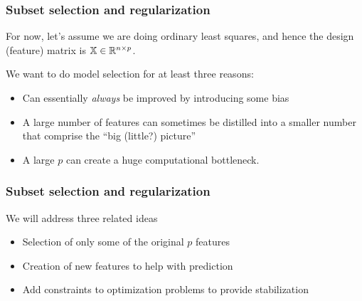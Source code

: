 \documentclass{beamer}
\begin{document}
\title{}
\subtitle{\classTitle}
\date{}



\begin{frame}
\maketitle
%
\organization
%
\end{frame}

\begin{frame}
\frametitle{Subset selection and regularization}
For now, let's assume we are doing ordinary least squares, and hence the design (feature) matrix is $\mathbb{X} \in \mathbb{R}^{n \times p}$.

\vsp
We want to do model selection for at least three reasons:
\begin{itemize}
\item {} Can essentially {\it always} be improved by introducing some bias 
\item {} A large number of features can sometimes be distilled into a smaller number that comprise the  ``big (little?) picture''
\item {} A large $p$ can create a huge computational bottleneck.  
\end{itemize}

\end{frame}
\begin{frame}
\frametitle{Subset selection and regularization}

We will address three related ideas 
\begin{itemize}
\item {} Selection of only some of the original $p$ features
\item {} Creation of new features to help with prediction
\item {} Add constraints to optimization problems to provide stabilization
\end{itemize}
\end{frame}
\end{document}
